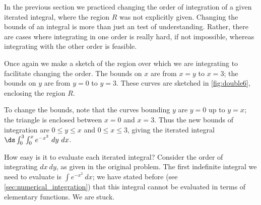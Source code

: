 In the previous section we practiced changing the order of integration of a given iterated integral, where the region $R$ was not explicitly given. Changing the bounds of an integral is more than just an test of understanding. Rather, there are cases where integrating in one order is really hard, if not impossible, whereas integrating with the other order is feasible.

{Once again we make a sketch of the region over which we are integrating to facilitate changing the order. The bounds on $x$ are from $x=y$ to $x=3$; the bounds on $y$ are from $y=0$ to $y=3$. These curves are sketched in \autoref{fig:double6}, enclosing the region $R$.


To change the bounds, note that the curves bounding $y$ are $y=0$ up to $y=x$; the triangle is enclosed between $x=0$ and $x=3$. Thus the new bounds of integration are $0\leq y\leq x$ and $0\leq x\leq 3$, giving the iterated integral $\ds \int_0^3\int_0^x e^{-x^2}\ dy\ dx$.

How easy is it to evaluate each iterated integral? Consider the order of integrating $dx\ dy$, as given in the original problem. The first indefinite integral we need to evaluate is $\int e^{-x^2}\ dx$; we have stated before (see \autoref{sec:numerical_integration}) that this integral cannot be evaluated in terms of elementary functions. We are stuck.

}
